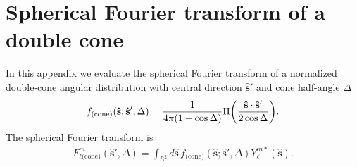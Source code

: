 \documentclass[]{osa-article}
\let\originalleft\left
\let\originalright\right
\renewcommand{\left}{\mathopen{}\mathclose\bgroup\originalleft}
\renewcommand{\right}{\aftergroup\egroup\originalright}
\providecommand{\mh}[1]{\mathbf{\hat{#1}}}
\providecommand{\mbb}[1]{\mathbb{#1}}
\begin{document}
\section{Spherical Fourier transform of a double cone}\label{sec:cone}
In this appendix we evaluate the spherical Fourier transform of a
normalized double-cone angular distribution with central direction $\mh{s}'$ and
cone half-angle $\Delta$
\begin{align}
  f_{\text{(cone)}}(\mh{s}; \mh{s}', \Delta) = \frac{1}{4\pi(1 - \cos\Delta)}\Pi\left(\frac{\mh{s}\cdot\mh{s}'}{2\cos\Delta}\right). \label{eq:doublecone}
\end{align}
The spherical Fourier transform is
\begin{align}
  F_{\ell\text{(cone)}}^m(\mh{s}', \Delta) = \int_{\mbb{S}^2}d\mh{s}\, f_{\text{(cone)}}(\mh{s}; \mh{s}', \Delta)Y_\ell^{m*}(\mh{s}).
\end{align}
\end{document}
